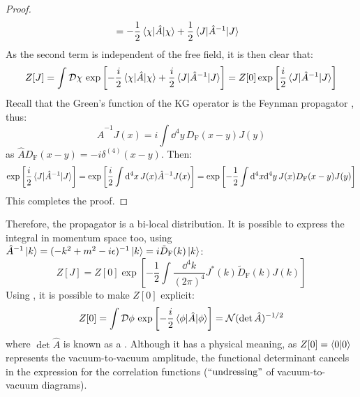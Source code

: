 \begin{proofbox}
\begin{proof}
\begin{equation*}
\begin{split}
        & = - \frac{1}{2} \braket{\chi | \hat{A} | \chi} + \frac{1}{2} \braket{J | \hat{A}^{-1} | J}
      \end{split}
    \end{equation*}
    As the second term is independent of the free field, it is then clear that:
    \begin{equation*}
      Z[J] = \int \mathcal{D}\chi\, \exp \left[ - \frac{i}{2} \braket{\chi | \hat{A} | \chi} + \frac{i}{2} \braket{J | \hat{A}^{-1} | J} \right] = Z[0] \exp \left[ \frac{i}{2} \braket{J | \hat{A}^{-1} | J} \right]
    \end{equation*}
    Recall that the Green's function of the KG operator is the Feynman propagator , thus:
    \begin{equation*}
      \hat{A}^{-1} J(x) = i \int \dd^4y\, D_\text{F}(x - y) J(y)
    \end{equation*}
    as $ \hat{A} D_\text{F}(x-y) = -i \delta^{(4)}(x-y) $. Then:
    \begin{equation*}
      \exp \left[ \frac{i}{2} \braket{J | \hat{A}^{-1} | J} \right] = \exp \left[ \frac{i}{2} \int \mathrm{d}^4x\, J(x) \hat{A}^{-1} J(x) \right] = \exp \left[ -\frac{1}{2} \int \mathrm{d}^4x \mathrm{d}^4y\, J(x) D_\text{F}(x-y) J(y) \right]
    \end{equation*}
    This completes the proof.
  \end{proof}
\end{proofbox}

Therefore, the propagator is a bi-local distribution. It is possible to express the integral in momentum space too, using $ \hat{A}^{-1} \ket{k} = (-k^2 + m^2 -i\epsilon)^{-1} \ket{k} = i \tilde{D}_\text{F}(k) \ket{k} $:
\begin{equation}
  Z[J] = Z[0] \exp \left[ - \frac{1}{2} \int \frac{\dd^4k}{(2\pi)^4} J^*(k) \tilde{D}_\text{F}(k) J(k) \right]
\end{equation}
Using , it is possible to make $ Z[0] $ explicit:
\begin{equation}
  Z[0] = \int \mathcal{D}\phi\, \exp \left[ - \frac{i}{2} \braket{\phi | \hat{A} | \phi} \right] = \mathcal{N} (\det \hat{A})^{-1/2}
\end{equation}
where $ \det\hat{A} $ is known as a . Although it has a physical meaning, as $ Z[0] = \braket{0 | 0} $ represents the vacuum-to-vacuum amplitude, the functional determinant cancels in the expression for the correlation functions ($ ``\text{undressing}" $ of vacuum-to-vacuum diagrams).

